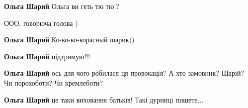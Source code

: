 \begin{itemize}
\begin{itemize}
 
\textbf{Ольга Шарий} Ольга ви геть тю тю🤪?🤣

 
ООО, говорюча голова )

 
\textbf{Ольга Шарий} Ко-ко-ко-корасный шарик))

 
\textbf{Ольга Шарий} підтримую!!!

 
\textbf{Ольга Шарий} ось для чого робилася ця провокація? А хто замовник? Шарій? Чи порохоботи? Чи кремлеботи?

 
\textbf{Ольга Шарий} це таки виховання батьків! Такі дурниці пишете...

 

\end{itemize}
\end{itemize}
